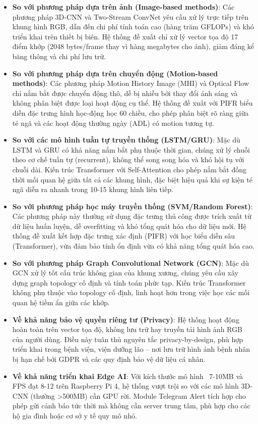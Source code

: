 \begin{itemize}
    \item \textbf{So với phương pháp dựa trên ảnh (Image-based methods)}: Các phương pháp 3D-CNN và Two-Stream ConvNet yêu cầu xử lý trực tiếp trên khung hình RGB, dẫn đến chi phí tính toán cao (hàng trăm GFLOPs) và khó triển khai trên thiết bị biên. Hệ thống đề xuất chỉ xử lý vector tọa độ 17 điểm khớp (2048 bytes/frame thay vì hàng megabytes cho ảnh), giảm đáng kể băng thông và chi phí lưu trữ.
    
    \item \textbf{So với phương pháp dựa trên chuyển động (Motion-based methods)}: Các phương pháp Motion History Image (MHI) và Optical Flow chỉ nắm bắt được chuyển động thô, dễ bị nhiễu bởi thay đổi ánh sáng và không phân biệt được loại hoạt động cụ thể. Hệ thống đề xuất với PIFR biểu diễn đặc trưng hình học-động học 60 chiều, cho phép phân biệt rõ ràng giữa té ngã và các hoạt động thường ngày (ADL) có motion tương tự.
    
    \item \textbf{So với các mô hình tuần tự truyền thống (LSTM/GRU)}: Mặc dù LSTM và GRU có khả năng nắm bắt phụ thuộc thời gian, chúng xử lý chuỗi theo cơ chế tuần tự (recurrent), không thể song song hóa và khó hội tụ với chuỗi dài. Kiến trúc Transformer với Self-Attention cho phép nắm bắt đồng thời mối quan hệ giữa tất cả các khung hình, đặc biệt hiệu quả khi sự kiện té ngã diễn ra nhanh trong 10-15 khung hình liên tiếp.
    
    \item \textbf{So với phương pháp học máy truyền thống (SVM/Random Forest)}: Các phương pháp này thường sử dụng đặc trưng thủ công được trích xuất từ dữ liệu huấn luyện, dễ overfitting và khó tổng quát hóa cho dữ liệu mới. Hệ thống đề xuất kết hợp đặc trưng xác định (PIFR) với học biểu diễn sâu (Transformer), vừa đảm bảo tính ổn định vừa có khả năng tổng quát hóa cao.
    
    \item \textbf{So với phương pháp Graph Convolutional Network (GCN)}: Mặc dù GCN xử lý tốt cấu trúc không gian của khung xương, chúng yêu cầu xây dựng graph topology cố định và tính toán phức tạp. Kiến trúc Transformer không phụ thuộc vào topology cố định, linh hoạt hơn trong việc học các mối quan hệ tiềm ẩn giữa các khớp.
    
    \item \textbf{Về khả năng bảo vệ quyền riêng tư (Privacy)}: Hệ thống hoạt động hoàn toàn trên vector tọa độ, không lưu trữ hay truyền tải hình ảnh RGB của người dùng. Điều này tuân thủ nguyên tắc privacy-by-design, phù hợp triển khai trong bệnh viện, viện dưỡng lão -- nơi lưu trữ hình ảnh bệnh nhân bị hạn chế bởi GDPR và các quy định bảo vệ dữ liệu cá nhân.
    
    \item \textbf{Về khả năng triển khai Edge AI}: Với kích thước mô hình ~7-10MB và FPS đạt 8-12 trên Raspberry Pi 4, hệ thống vượt trội so với các mô hình 3D-CNN (thường >500MB) cần GPU rời. Module Telegram Alert tích hợp cho phép gửi cảnh báo tức thời mà không cần server trung tâm, phù hợp cho các hộ gia đình hoặc cơ sở y tế quy mô nhỏ.
\end{itemize}

